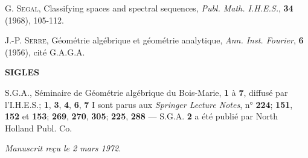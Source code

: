 \documentclass[11pt,leqno]{article}
\begin{document}
{\noindent [14] G. \textsc{Segal}, Classifying spaces and spectral sequences, \textit{Publ. Math. I.H.E.S.}, \textbf{34} (1968), 105-112.

\noindent [15] J.-P. \textsc{Serre}, Géométrie algébrique et géométrie analytique, \textit{Ann. Inst. Fourier}, \textbf{6} (1956), cité G.A.G.A.

\begin{center}
\textbf{SIGLES}
\end{center}

\noindent S.G.A., Séminaire de Géométrie algébrique du Bois-Marie, \textbf{1} à \textbf{7}, diffusé par l’I.H.E.S.; \textbf{1}, \textbf{3}, \textbf{4}, \textbf{6}, \textbf{7} I sont parus aux \textit{Springer Lecture Notes}, n° \textbf{224}; \textbf{151}, \textbf{152} et \textbf{153}; \textbf{269}, \textbf{270}, \textbf{305}; \textbf{225}, \textbf{288} — S.G.A. \textbf{2} a été publié par North Holland Publ. Co.
\par
}

\begin{flushright}
\textit{Manuscrit reçu le 2 mars 1972.}
\end{flushright}
\end{document}
